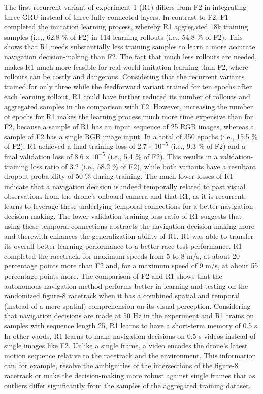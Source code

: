 The first recurrent variant of experiment 1 (R1)
differs from F2 in integrating three GRU
instead of three fully-connected layers.
In contrast to F2,
F1 completed the imitation learning process,
whereby R1 aggregated 18k training samples (i.e., 62.8 \% of F2)
in 114 learning rollouts (i.e., 54.8 \% of F2).
This shows that R1 needs substantially less training samples
to learn a more accurate navigation decision-making than F2.
The fact that much less rollouts are needed,
makes R1 much more feasible for real-world imitation learning than F2,
where rollouts can be costly and dangerous.
Considering that the recurrent variants trained for only three
while the feedforward variant trained for ten epochs after each learning rollout,
R1 could have further reduced its number of rollouts and aggregated samples
in the comparison with F2.
However, increasing the number of epochs for R1 makes the 
learning process much more time expensive than for F2,
because a sample of R1 
has an input sequence of 25 RGB images,
whereas a sample of F2 has a single RGB image input.
In a total of 350 epochs (i.e., 15.5 \% of F2),
R1 achieved a final training loss of $2.7\times 10^{-5}$ 
(i.e., 9.3 \% of F2)
and a final validation loss of
$8.6\times 10^{-5}$
(i.e., 5.4 \% of F2).
This results in a validation-training loss ratio
of 3.2 (i.e., 58.2 \% of F2),
while both variants have a resultant dropout probability of 50 \% during training.
The much lower losses of R1 indicate
that a navigation decision is indeed temporally related
to past visual observations from the drone's onboard camera
and that R1, as it is recurrent, 
learns to leverage these underlying temporal connections
for a better navigation decision-making.
The lower validation-training loss ratio of R1 
suggests that using these temporal connections
abstracts the navigation decision-making more and therewith
enhances the generalization ability of R1.
R1 was able to transfer its overall better learning performance to a better race test performance.
R1 completed the racetrack, for maximum speeds from 5 to 8 m/s, at about 20 percentage points more than F2
and, for a maximum speed of 9 m/s, at about 55 percentage points more.
The comparison of F2 and R1
shows that the autonomous navigation method
performs better in learning and testing
on the randomized figure-8 racetrack
when it has a combined spatial and temporal 
(instead of a mere spatial) comprehension on its visual perception.
Considering that navigation decisions are made at 50 Hz in the experiment
and R1 trains on samples with sequence length 25,
R1 learns to have a short-term memory of 0.5 s.
In other words, R1 learns to make navigation decisions on 0.5 s videos instead of single images like F2.
Unlike a single frame, a video encodes the drone's latest motion sequence 
relative to the racetrack and the environment.
This information can, for example, resolve the ambiguities of the intersections of the figure-8 racetrack
or make the decision-making more robust against single frames that as outliers 
differ significantly from the samples of the aggregated training dataset.



